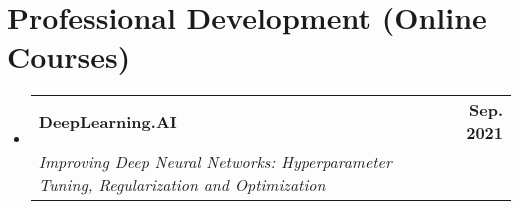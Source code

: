 \documentclass[letterpaper,11pt]{article}
\makeatletter
\newcommand{\resumeSubheading}[4]{
  \vspace{-2pt}\item
    \begin{tabular*}{1.0\textwidth}[t]{l@{\extracolsep{\fill}}r}
      \textbf{#1} & \textbf{\small #2} \\
      \textit{\small#3} & \textit{\small #4} \\
    \end{tabular*}\vspace{-7pt}
}
\newcommand{\resumeSubHeadingListStart}{\begin{itemize}[leftmargin=0.0in, label={}]}
\newcommand{\resumeSubHeadingListEnd}{\end{itemize}}
\makeatother
\begin{document}

\section{Professional Development (Online Courses)}
\resumeSubHeadingListStart
\resumeSubheading
{DeepLearning.AI}{Sep. 2021}{Improving Deep Neural Networks: Hyperparameter Tuning, Regularization and Optimization}{}
\resumeSubHeadingListEnd



\end{document}
